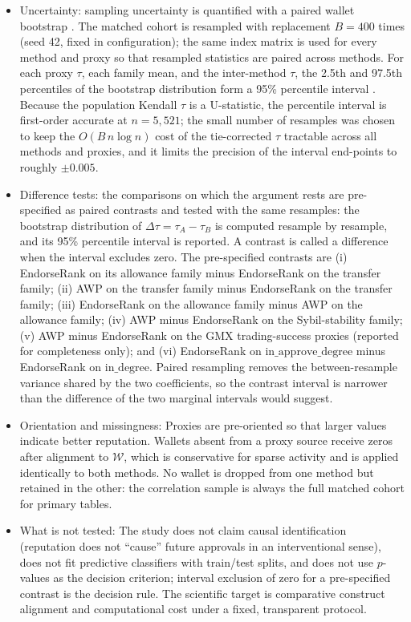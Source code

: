 \begin{itemize}
\item Uncertainty: sampling uncertainty is quantified with a paired wallet bootstrap . The matched cohort is resampled with replacement $B=400$ times (seed 42, fixed in configuration); the same index matrix is used for every method and proxy so that resampled statistics are paired across methods. For each proxy $\tau$, each family mean, and the inter-method $\tau$, the 2.5th and 97.5th percentiles of the bootstrap distribution form a 95\% percentile interval . Because the population Kendall $\tau$ is a U-statistic, the percentile interval is first-order accurate at $n=5{,}521$; the small number of resamples was chosen to keep the $O(B\,n\log n)$ cost of the tie-corrected $\tau$ tractable across all methods and proxies, and it limits the precision of the interval end-points to roughly $\pm 0.005$.

\item Difference tests: the comparisons on which the argument rests are pre-specified as paired contrasts and tested with the same resamples: the bootstrap distribution of $\Delta\tau=\tau_A-\tau_B$ is computed resample by resample, and its 95\% percentile interval is reported. A contrast is called a difference when the interval excludes zero. The pre-specified contrasts are (i) EndorseRank on its allowance family minus EndorseRank on the transfer family; (ii) AWP on the transfer family minus EndorseRank on the transfer family; (iii) EndorseRank on the allowance family minus AWP on the allowance family; (iv) AWP minus EndorseRank on the Sybil-stability family; (v) AWP minus EndorseRank on the GMX trading-success proxies (reported for completeness only); and (vi) EndorseRank on $\mathrm{in\_approve\_degree}$ minus EndorseRank on $\mathrm{in\_degree}$. Paired resampling removes the between-resample variance shared by the two coefficients, so the contrast interval is narrower than the difference of the two marginal intervals would suggest.

\item Orientation and missingness: Proxies are pre-oriented so that larger values indicate better reputation. Wallets absent from a proxy source receive zeros after alignment to $\mathcal{W}$, which is conservative for sparse activity and is applied identically to both methods. No wallet is dropped from one method but retained in the other: the correlation sample is always the full matched cohort for primary tables.

\item What is not tested: The study does not claim causal identification (reputation does not ``cause'' future approvals in an interventional sense), does not fit predictive classifiers with train/test splits, and does not use $p$-values as the decision criterion; interval exclusion of zero for a pre-specified contrast is the decision rule. The scientific target is comparative construct alignment and computational cost under a fixed, transparent protocol.

\end{itemize}

